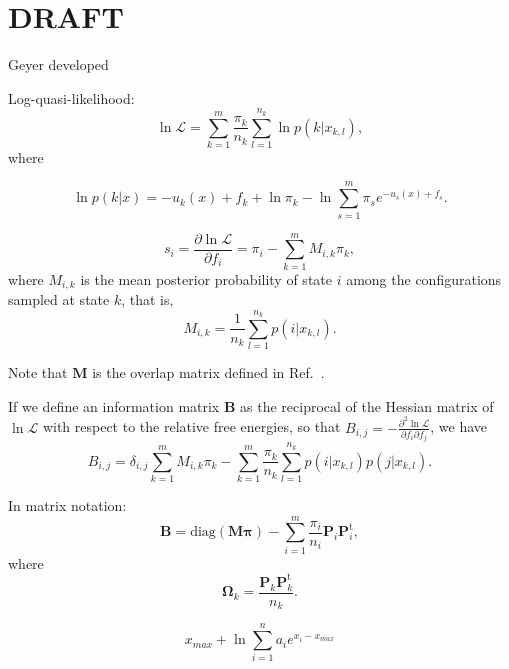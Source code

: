 \documentclass[aip,jcp,reprint,amsmath,amssymb]{revtex4-1}
\newcommand{\mt}[1]{\boldsymbol{\mathbf{#1}}}           %
\newcommand{\vt}[1]{\boldsymbol{\mathbf{#1}}}           %
\newcommand{\tr}[1]{#1^\text{t}}                        %
\begin{document}
\section{DRAFT}

Geyer\cite{Geyer_1994} developed 

Log-quasi-likelihood:\cite{Doss_2014, Tan_2015, Roy_2018}
\begin{equation}
\label{eq:gmbar log quasi-likelihood}
\ln \mathcal L = \sum_{k=1}^m \frac{\pi_k}{n_k} \sum_{l=1}^{n_k} \ln p(k|x_{k,l}),
\end{equation}
where

\begin{equation*}
\ln p(k|x) = -u_k(x) + f_k + \ln \pi_k - \ln \sum_{s=1}^m \pi_s e^{-u_s(x) + f_s}.
\end{equation*}

\begin{equation*}
s_i = \frac{\partial \ln \mathcal L}{\partial f_i} = \pi_i - \sum_{k=1}^m M_{i,k} \pi_k,
\end{equation*}
where $M_{i,k}$ is the mean posterior probability of state $i$ among the configurations sampled at state $k$, that is,
\begin{equation*}
M_{i,k} = \frac{1}{n_k} \sum_{l=1}^{n_k} p(i|x_{k,l}).
\end{equation*}

Note that $\mt M$ is the overlap matrix defined in Ref.~.

If we define an information matrix $\mt B$ as the reciprocal of the Hessian matrix of $\ln \mathcal L$ with respect to the relative free energies, so that $B_{i,j} = -\frac{\partial^2 \ln \mathcal L}{\partial f_i \partial f_j}$, we have
\begin{equation*}
B_{i,j} = \delta_{i,j} \sum_{k=1}^m M_{i,k} \pi_k - \sum_{k=1}^m \frac{\pi_k}{n_k} \sum_{l=1}^{n_k} p(i|x_{k,l})p(j|x_{k,l}).
\end{equation*}

In matrix notation:
\begin{equation*}
\mt B = \text{diag}(\mt M \vt \pi) - \sum_{i=1}^m \frac{\pi_i}{n_i} \mt P_i \tr{\mt P}_i,
\end{equation*}
where
\begin{equation*}
\mt \Omega_k = \frac{\mt P_k \tr{\mt P}_k}{n_k}.
\end{equation*}


\begin{equation}
x_{max} + \ln \sum_{i=1}^n a_i e^{x_i -x_{max}}
\end{equation}
\end{document}
